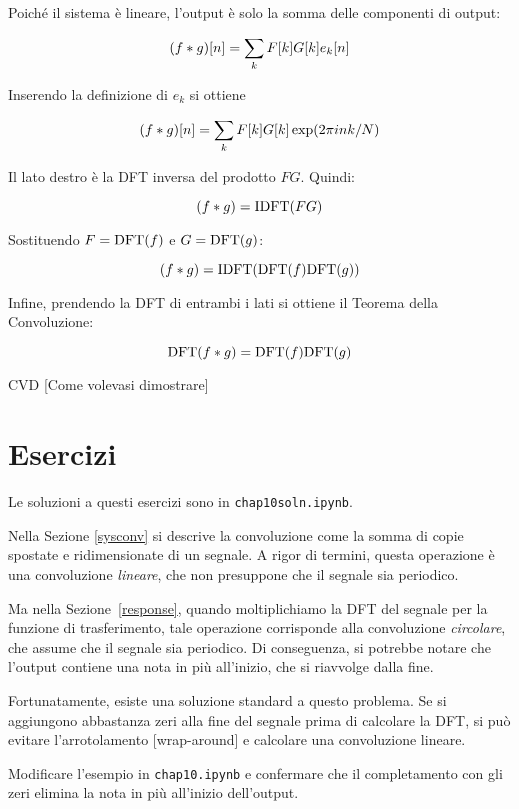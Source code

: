 \documentclass[12pt]{book} \usepackage[width=5.5in,height=8.5in, hmarginratio=3:2,vmarginratio=1:1]{geometry}
\begin{document}
Poiché il sistema è lineare, l'output è solo la somma delle componenti di output:

%
\[ (f \ast g)[n] = \sum_k F[k] G[k] e_k[n] \] 

%
Inserendo la definizione di $e_k$ si ottiene

%
\[ (f \ast g)[n] = \sum_k F[k] G[k] \exp(2 \pi i n k / N) \] 

%
Il lato destro è la DFT inversa del prodotto $F G$. Quindi:

%
\[ (f \ast g) = \mathrm{IDFT}( F G ) \] 

%
Sostituendo $F = \mathrm{DFT}(f)$ e $G = \mathrm{DFT}(g)$:

%
\[ (f \ast g) = \mathrm{IDFT}( \mathrm{DFT}(f) \mathrm{DFT}(g) ) \] 

%
Infine, prendendo la DFT di entrambi i lati si ottiene il Teorema della Convoluzione:

%
\[ \mathrm{DFT}(f \ast g) = \mathrm{DFT}(f) \mathrm{DFT}(g) \] 

%
CVD [Come volevasi dimostrare]

\section{Esercizi} 

Le soluzioni a questi esercizi sono in {\tt chap10soln.ipynb}.

\begin{exercise} Nella Sezione \ref{sysconv} si descrive la convoluzione come la somma di copie spostate e ridimensionate di un segnale. A rigor di termini, questa operazione è una convoluzione {\em lineare}, che non presuppone che il segnale sia periodico.

Ma nella Sezione~\ref{response}, quando moltiplichiamo la DFT del segnale per la funzione di trasferimento, tale operazione corrisponde alla convoluzione {\em circolare}, che assume che il segnale sia periodico. Di conseguenza, si potrebbe notare che l'output contiene una nota in più all'inizio, che si riavvolge dalla fine.

Fortunatamente, esiste una soluzione standard a questo problema. Se si aggiungono abbastanza zeri alla fine del segnale prima di calcolare la DFT, si può evitare l'arrotolamento [wrap-around] e calcolare una convoluzione lineare.

Modificare l'esempio in {\tt chap10.ipynb} e confermare che il completamento con gli zeri elimina la nota in più all'inizio dell'output. \end{exercise} 
\end{document}
